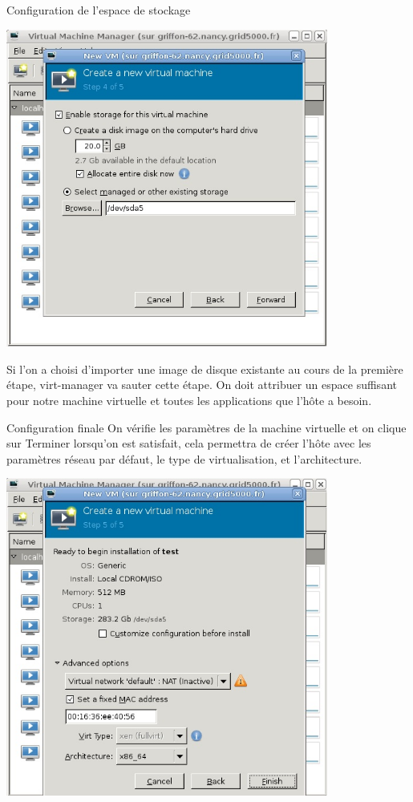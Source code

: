 Configuration de l'espace de stockage
\begin{center}
\includegraphics[width=300pt]{images/Storage.jpg}
\end{center}

 Si l'on a choisi d'importer une image de disque existante au cours de la première étape, virt-manager va sauter cette étape.
On doit attribuer un espace suffisant pour notre machine virtuelle et toutes les applications que l'hôte a besoin.

Configuration finale
On vérifie les paramètres de la machine virtuelle et on clique sur Terminer lorsqu'on est satisfait, cela permettra de créer l'hôte avec les paramètres réseau par défaut, le type de virtualisation, et l'architecture.
\begin{center}
\includegraphics[width=300pt]{images/reseau.jpg}
\end{center}


